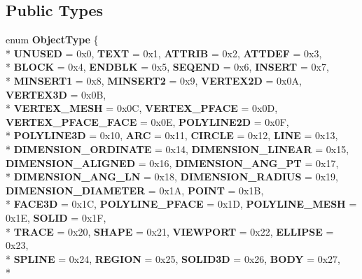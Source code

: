 \subsection*{Public Types}
\begin{DoxyCompactItemize}
\item 
enum {\bfseries Object\+Type} \{ \\*
{\bfseries U\+N\+U\+S\+ED} = 0x0, 
{\bfseries T\+E\+XT} = 0x1, 
{\bfseries A\+T\+T\+R\+IB} = 0x2, 
{\bfseries A\+T\+T\+D\+EF} = 0x3, 
\\*
{\bfseries B\+L\+O\+CK} = 0x4, 
{\bfseries E\+N\+D\+B\+LK} = 0x5, 
{\bfseries S\+E\+Q\+E\+ND} = 0x6, 
{\bfseries I\+N\+S\+E\+RT} = 0x7, 
\\*
{\bfseries M\+I\+N\+S\+E\+R\+T1} = 0x8, 
{\bfseries M\+I\+N\+S\+E\+R\+T2} = 0x9, 
{\bfseries V\+E\+R\+T\+E\+X2D} = 0x0A, 
{\bfseries V\+E\+R\+T\+E\+X3D} = 0x0B, 
\\*
{\bfseries V\+E\+R\+T\+E\+X\+\_\+\+M\+E\+SH} = 0x0C, 
{\bfseries V\+E\+R\+T\+E\+X\+\_\+\+P\+F\+A\+CE} = 0x0D, 
{\bfseries V\+E\+R\+T\+E\+X\+\_\+\+P\+F\+A\+C\+E\+\_\+\+F\+A\+CE} = 0x0E, 
{\bfseries P\+O\+L\+Y\+L\+I\+N\+E2D} = 0x0F, 
\\*
{\bfseries P\+O\+L\+Y\+L\+I\+N\+E3D} = 0x10, 
{\bfseries A\+RC} = 0x11, 
{\bfseries C\+I\+R\+C\+LE} = 0x12, 
{\bfseries L\+I\+NE} = 0x13, 
\\*
{\bfseries D\+I\+M\+E\+N\+S\+I\+O\+N\+\_\+\+O\+R\+D\+I\+N\+A\+TE} = 0x14, 
{\bfseries D\+I\+M\+E\+N\+S\+I\+O\+N\+\_\+\+L\+I\+N\+E\+AR} = 0x15, 
{\bfseries D\+I\+M\+E\+N\+S\+I\+O\+N\+\_\+\+A\+L\+I\+G\+N\+ED} = 0x16, 
{\bfseries D\+I\+M\+E\+N\+S\+I\+O\+N\+\_\+\+A\+N\+G\+\_\+PT} = 0x17, 
\\*
{\bfseries D\+I\+M\+E\+N\+S\+I\+O\+N\+\_\+\+A\+N\+G\+\_\+LN} = 0x18, 
{\bfseries D\+I\+M\+E\+N\+S\+I\+O\+N\+\_\+\+R\+A\+D\+I\+US} = 0x19, 
{\bfseries D\+I\+M\+E\+N\+S\+I\+O\+N\+\_\+\+D\+I\+A\+M\+E\+T\+ER} = 0x1A, 
{\bfseries P\+O\+I\+NT} = 0x1B, 
\\*
{\bfseries F\+A\+C\+E3D} = 0x1C, 
{\bfseries P\+O\+L\+Y\+L\+I\+N\+E\+\_\+\+P\+F\+A\+CE} = 0x1D, 
{\bfseries P\+O\+L\+Y\+L\+I\+N\+E\+\_\+\+M\+E\+SH} = 0x1E, 
{\bfseries S\+O\+L\+ID} = 0x1F, 
\\*
{\bfseries T\+R\+A\+CE} = 0x20, 
{\bfseries S\+H\+A\+PE} = 0x21, 
{\bfseries V\+I\+E\+W\+P\+O\+RT} = 0x22, 
{\bfseries E\+L\+L\+I\+P\+SE} = 0x23, 
\\*
{\bfseries S\+P\+L\+I\+NE} = 0x24, 
{\bfseries R\+E\+G\+I\+ON} = 0x25, 
{\bfseries S\+O\+L\+I\+D3D} = 0x26, 
{\bfseries B\+O\+DY} = 0x27, 
\\*

\end{DoxyCompactItemize}
